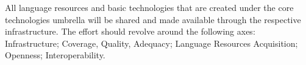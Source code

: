 \documentclass[10pt, plain]{../../metanetpaper}
\begin{document}
\begin{multicols}{2}
All language resources and basic technologies that are created under the core technologies umbrella will be shared and made available through the respective infrastructure. The effort should revolve around the following axes: Infrastructure; Coverage, Quality, Adequacy; Language Resources Acquisition; Openness; Interoperability.


%
%
%
%
%
%
%


\end{multicols}
\end{document}
